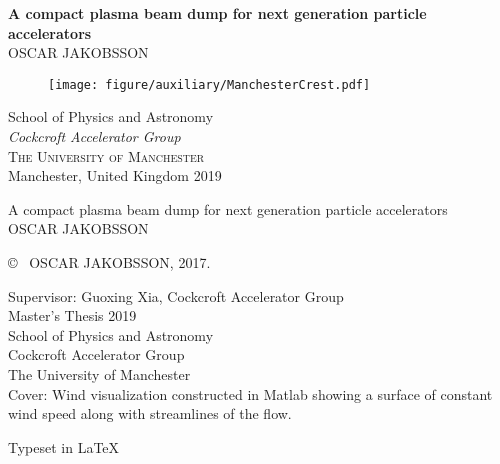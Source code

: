 \newpage
{}	%
\thispagestyle{empty}
\begin{center}
	\textbf{\Huge A compact plasma beam dump for next generation particle accelerators} \\[1cm]
	{\large OSCAR JAKOBSSON}
	
	\vfill	
	\begin{figure}[H]
	\centering
	\texttt{[image: figure/auxiliary/ManchesterCrest.pdf]} \\	
	\end{figure}	\vspace{5mm}	
	
	School of Physics and Astronomy \\
	\textit{Cockcroft Accelerator Group}\\
	\textsc{The University of Manchester} \\
	Manchester, United Kingdom 2019 \\
\end{center}


\newpage
\thispagestyle{plain}
\vspace*{4.5cm}
A compact plasma beam dump for next generation particle accelerators\\
OSCAR JAKOBSSON \setlength{\parskip}{1cm}

\copyright ~ OSCAR JAKOBSSON, 2017. \setlength{\parskip}{1cm}

Supervisor: Guoxing Xia, Cockcroft Accelerator Group\\

Master's Thesis 2019\\	%
School of Physics and Astronomy\\
Cockcroft Accelerator Group\\
The University of Manchester\\

\vfill
Cover: Wind visualization constructed in Matlab showing a surface of constant wind speed along with streamlines of the flow. \setlength{\parskip}{0.5cm}

Typeset in \LaTeX \\

